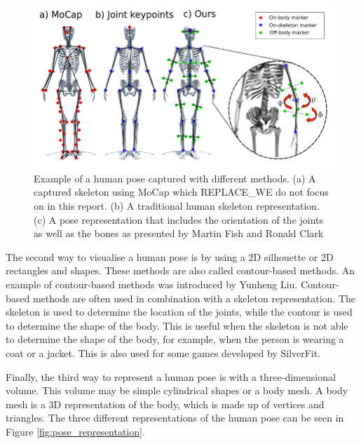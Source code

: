 \begin{figure}
    \centering
    \includegraphics[width=0.8\linewidth]{figures/HPE/PoseExample.png}
    \caption[Example for human Pose estimation]{Example of a human pose captured with different methods. (a) A captured skeleton using MoCap which REPLACE_WE do not focus on in this report. (b) A traditional human skeleton representation. (c) A pose representation that includes the orientation of the joints as well as the bones as presented by Martin Fish and Ronald Clark\cite{KeypointOrientation}}
    \label{fig:pose_example}
\end{figure}

The second way to visualise a human pose is by using a 2D silhouette or 2D rectangles and shapes. These methods are also called contour-based methods. An example of contour-based methods was introduced by Yunheng Liu\cite{contourHPE}. Contour-based methods are often used in combination with a skeleton representation. The skeleton is used to determine the location of the joints, while the contour is used to determine the shape of the body. This is useful when the skeleton is not able to determine the shape of the body, for example, when the person is wearing a coat or a jacket. This is also used for some games developed by SilverFit.

Finally, the third way to represent a human pose is with a three-dimensional volume. This volume may be simple cylindrical shapes or a body mesh. A body mesh is a 3D representation of the body, which is made up of vertices and triangles. The three different representations of the human pose can be seen in Figure \ref{fig:pose_representation}.

